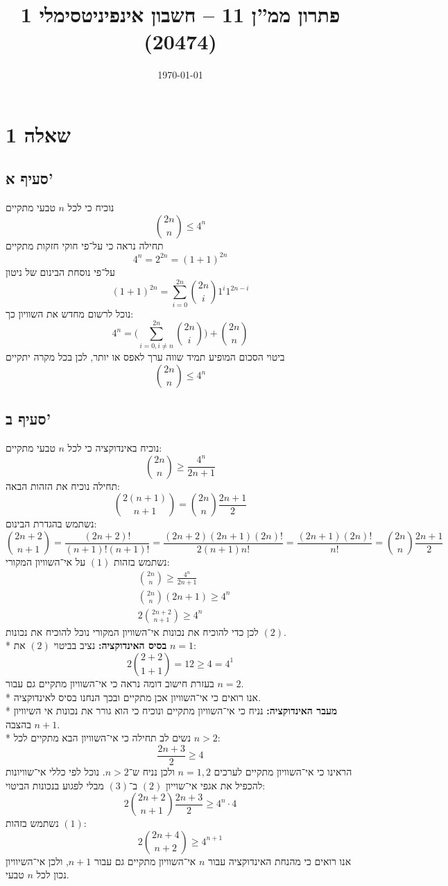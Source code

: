 \documentclass[a4paper]{article}
\title{פתרון ממ''ן 11 – חשבון אינפיניטסימלי 1 (20474)}
\author{\AUTHOR}
\date\today
\begin{document}
\maketitle
\section{שאלה 1}
\subsection{סעיף א'}
נוכיח כי לכל $n$ טבעי מתקיים
\[
	\binom{2n}{n} \le 4^n
\]
תחילה נראה כי על־פי חוקי חזקות מתקיים
\[
	4^n = 2^{2n} = {(1 + 1)}^{2n}
\]
על־פי נוסחת הבינום של ניטון
\[
	{(1 + 1)}^{2n} = \sum_{i = 0}^{2n} \binom{2n}{i} 1^i 1^{2n - i}
\]
נוכל לרשום מחדש את השוויון כך:
\[
	4^n = \Bigg( \sum_{i = 0, i \ne n}^{2n} \binom{2n}{i} \Bigg)
	+ \binom{2n}{n}
\]
ביטוי הסכום המופיע תמיד שווה ערך לאפס או יותר, לכן בכל מקרה יתקיים
\[
	\binom{2n}{n} \le 4^n
\]

\subsection{סעיף ב'}
נוכיח באינדוקציה כי לכל $n$ טבעי מתקיים:
\[
	\binom{2n}{n} \ge \frac{4^n}{2n + 1}
\]
תחילה נוכיח את הזהות הבאה:
\[
	\binom{2(n + 1)}{n + 1}
	= \binom{2n}{n} \frac{2n + 1}{2}
	\tag{1}
\]
נשתמש בהגדרת הבינום:
\[
	\binom{2n + 2}{n + 1}
	= \frac{(2n + 2)!}{(n + 1)! (n + 1)!}
	= \frac{(2n + 2)(2n + 1) (2n)!}{2 (n + 1) n!}
	= \frac{(2n + 1) (2n)!}{n!}
	= \binom{2n}{n} \frac{2n + 1}{2}
\]
נשתמש בזהות $(1)$ על אי־השוויון המקורי:
\begin{align*}
	& \binom{2n}{n} \ge \frac{4^n}{2n + 1} \\
	& \binom{2n}{n} (2n + 1) \ge 4^n \\
	& 2 \binom{2n + 2}{n + 1} \ge 4^n \tag{2}
\end{align*}
לכן כדי להוכיח את נכונות אי־השוויון המקורי נוכל להוכיח את נכונות $(2)$. \\*
\textbf{בסיס האינדוקציה:}
נציב בביטוי $(2)$ את $n = 1$:
\[
	2 \binom{2 + 2}{1 + 1} = 12 \ge 4 = 4^1
\]
בעזרת חישוב דומה נראה כי אי־השוויון מתקיים גם עבור $n = 2$. \\*
אנו רואים כי אי־השוויון אכן מתקיים ובכך הנחנו בסיס לאינדוקציה. \\*
\textbf{מעבר האינדוקציה:}
נניח כי אי־השוויון מתקיים ונוכיח כי הוא גורר
את נכונות אי השיוויון בהצבה $n + 1$. \\*
נשים לב תחילה כי אי־השוויון הבא מתקיים לכל $n > 2$:
\[
	\frac{2n + 3}{2} \ge 4 \tag{3}
\]
הראינו כי אי־השוויון מתקיים לערכים $n = 1, 2$ ולכן נניח ש־$n > 2$.
נוכל לפי כללי אי־שוויונות להכפיל את אגפי אי־שוייון $(2)$ ב־$(3)$
מבלי לפגוע בנכונות הביטוי:
\[
	2 \binom{2n + 2}{n + 1} \frac{2n + 3}{2}  \ge 4^n \cdot 4
\]
נשתמש בזהות $(1)$:
\[
	2 \binom{2n + 4}{n + 2} \ge 4^{n + 1}
\]
אנו רואים כי מהנחת האינדוקציה עבור $n$ אי־השוויון מתקיים גם עבור $n + 1$,
ולכן אי־השיוויון נכון לכל $n$ טבעי.
\end{document}
